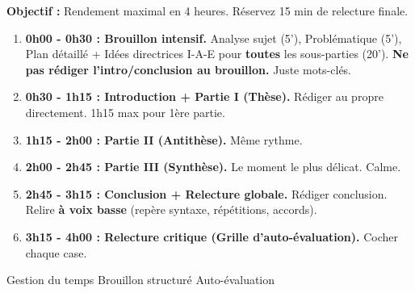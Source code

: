 \documentclass[11pt]{article}
\newcommand{\cle}[1]{{\popxbold\color{popdark}#1}}
\begin{document}
\begin{methode}
\textbf{Objectif :} Rendement maximal en 4 heures. Réservez 15 min de relecture finale.
\begin{enumerate}
    \item \textbf{0h00 - 0h30 : Brouillon intensif.} Analyse sujet (5'), Problématique (5'), Plan détaillé + Idées directrices I-A-E pour \textbf{toutes} les sous-parties (20'). \textbf{Ne pas rédiger l'intro/conclusion au brouillon.} Juste mots-clés.
    \item \textbf{0h30 - 1h15 : Introduction + Partie I (Thèse).} Rédiger au propre directement. 1h15 max pour 1ère partie.
    \item \textbf{1h15 - 2h00 : Partie II (Antithèse).} Même rythme.
    \item \textbf{2h00 - 2h45 : Partie III (Synthèse).} Le moment le plus délicat. Calme.
    \item \textbf{2h45 - 3h15 : Conclusion + Relecture globale.} Rédiger conclusion. Relire \textbf{à voix basse} (repère syntaxe, répétitions, accords).
    \item \textbf{3h15 - 4h00 : Relecture critique (Grille d'auto-évaluation).} Cocher chaque case.
\end{enumerate}
\cle{Gestion du temps} \cle{Brouillon structuré} \cle{Auto-évaluation}
\end{methode}
\end{document}
